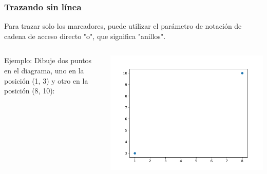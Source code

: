 \begin{frame}[fragile]
  \frametitle{Trazando sin línea}
  Para trazar solo los marcadores, puede utilizar el parámetro
  de notación de cadena de acceso directo "o", que significa "anillos".
  \begin{columns}
        \begin{exampleblock}{Ejemplo:}
          Dibuje dos puntos en el diagrama, uno en la
          posición (1, 3) y otro en la posición (8, 10):
          
        \end{exampleblock}
      \pausa
      \begin{center}
          \includegraphics[scale=0.5]{ejemplos/e03.pdf}
      \end{center}
  \end{columns}
\end{frame}

